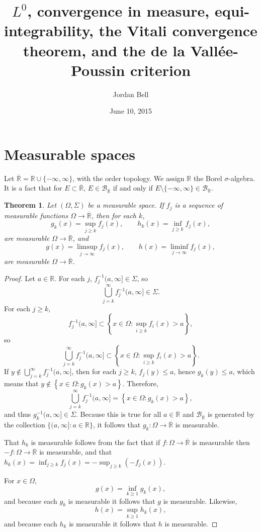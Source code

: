 \documentclass{article}
\newtheorem{theorem}{Theorem}
\theoremstyle{definition}
\begin{document}
\title{$L^0$, convergence in measure,  equi-integrability, the Vitali convergence theorem, and the de la Vall\'ee-Poussin criterion}
\author{Jordan Bell}
\date{June 10, 2015}

\maketitle

\section{Measurable spaces}
Let $\overline{\mathbb{R}}=\mathbb{R} \cup \{-\infty,\infty\}$, with the order topology.
We assign $\mathbb{R}$ the Borel $\sigma$-algebra. 
It is a fact that for $E \subset \overline{\mathbb{R}}$,
 $E \in \mathscr{B}_{\overline{\mathbb{R}}}$
if and only if  $E \setminus \{-\infty,\infty\} \in \mathscr{B}_{\mathbb{R}}$.


\begin{theorem}
Let $(\Omega,\Sigma)$ be a measurable space. 
If $f_j$ is a sequence of measurable functions $\Omega \to \overline{\mathbb{R}}$, then for each $k$,
\[
g_k(x)= \sup_{j \geq k} f_j(x), \qquad h_k(x)=  \inf_{j \geq k} f_j(x),
\]
are measurable $\Omega \to \overline{\mathbb{R}}$, and
\[
g(x) = \limsup_{j \to \infty} f_j(x), \qquad h(x) = \liminf_{j \to \infty} f_j(x),
\]
are measurable $\Omega \to \overline{\mathbb{R}}$.
\label{supmeasurable}
\end{theorem}
\begin{proof}
Let $a \in \mathbb{R}$. For each $j$, $f_j^{-1}(a,\infty] \in \Sigma$, so
\[
\bigcup_{j=k}^\infty f_j^{-1}(a,\infty] \in \Sigma.
\]
For each $j \geq k$,
\[
f_j^{-1}(a,\infty] \subset \left\{ x \in \Omega: \sup_{i \geq k} f_i(x) > a \right\},
\]
so
\[
\bigcup_{j=k}^\infty f_j^{-1}(a,\infty] \subset \left\{ x \in \Omega: \sup_{i \geq k} f_i(x) > a \right\}.
\]
If $y \not \in \bigcup_{j=k}^\infty f_j^{-1}(a,\infty]$, then for each $j \geq k$, $f_j(y) \leq a$, hence
$g_k(y) \leq a$, which means that
$y \not \in \left\{ x \in \Omega: g_k(x) > a \right\}$. Therefore,
\[
\bigcup_{j=k}^\infty f_j^{-1}(a,\infty]
=\left\{ x \in \Omega: g_k(x) > a \right\},
\]
and thus
$g_k^{-1}(a,\infty] \in \Sigma$. Because this is true for all $a \in \mathbb{R}$ and
$\mathscr{B}_{\overline{\mathbb{R}}}$ is generated by the collection 
$\{(a,\infty]: a \in \mathbb{R}\}$, it follows that $g_k:\Omega \to \overline{\mathbb{R}}$ is measurable. 

That $h_k$ is measurable follows from the fact that if $f:\Omega \to \overline{\mathbb{R}}$ is measurable
then $-f:\Omega \to \overline{\mathbb{R}}$ is measurable, and that
$h_k(x)=\inf_{j \geq k} f_j(x) = -\sup_{j \geq k} (-f_j(x))$. 

For $x \in \Omega$,
\[
g(x) = \inf_{k \geq 1} g_k(x),
\]
and because each $g_k$ is measurable it follows that $g$ is measurable. Likewise,
\[
h(x) = \sup_{k \geq 1} h_k(x),
\]
and because each $h_k$ is measurable it follows that $h$ is measurable.
\end{proof}
\end{document}
